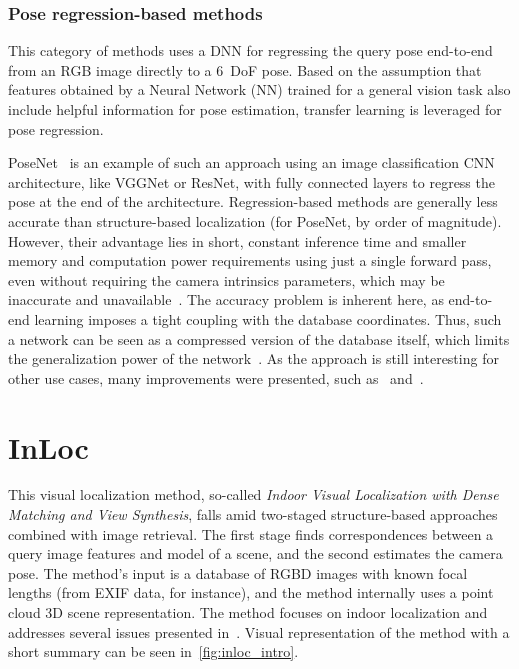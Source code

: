 \subsubsection*{Pose regression-based methods}

This category of methods uses a DNN for regressing the query pose end-to-end from an RGB image
directly to a 6~DoF pose. Based on the assumption that features obtained by a Neural Network (NN) trained for a general vision task
also include helpful information for pose estimation, transfer learning is leveraged for pose regression.

PoseNet~\citep{PoseNet} is an example of such an approach using an image classification CNN architecture, like
VGGNet or ResNet, with fully connected layers to regress the pose at the end of the architecture. Regression-based
methods are generally less accurate than structure-based localization (for PoseNet, by order of magnitude).
However, their advantage lies in short, constant inference time and smaller memory and computation power requirements
using just a single forward pass, even without requiring the camera intrinsics parameters, which may be
inaccurate and unavailable~\citep{RegressionAutoEnc}. The accuracy problem is inherent here, as end-to-end
learning imposes a tight coupling with the database coordinates. Thus, such a network can be seen as a compressed
version of the database itself, which limits the generalization power of the network~\citep{naverlabs}. As the approach is still
interesting for other use cases, many improvements were presented, such as~\citet{DNNRegression, Maps, VLocNet}
and~\citet{VLocNetpp}.


\section{InLoc}\label{sec:inloc}
This visual localization method, so-called \emph{Indoor Visual Localization with Dense Matching
and View Synthesis}, falls amid two-staged structure-based approaches combined with image retrieval. The first stage finds correspondences between a query image features and model of a scene, and the second estimates the camera pose.
The method's input is a database of RGBD
images with known focal lengths (from EXIF data, for instance), and the method internally uses a point cloud 3D scene
representation. The method focuses on indoor localization and addresses several 
issues presented in~. Visual representation of the method with a short summary can be seen in~\cref{fig:inloc_intro}. 

